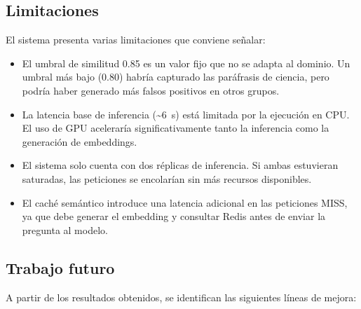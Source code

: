\subsection{Limitaciones}

El sistema presenta varias limitaciones que conviene señalar:

\begin{itemize}
    \item El umbral de similitud 0.85 es un valor fijo que no se adapta al dominio. Un umbral más bajo (0.80) habría capturado las paráfrasis de ciencia, pero podría haber generado más falsos positivos en otros grupos.
    
    \item La latencia base de inferencia (\textasciitilde6~s) está limitada por la ejecución en CPU. El uso de GPU aceleraría significativamente tanto la inferencia como la generación de embeddings.
    
    \item El sistema solo cuenta con dos réplicas de inferencia. Si ambas estuvieran saturadas, las peticiones se encolarían sin más recursos disponibles.
    
    \item El caché semántico introduce una latencia adicional en las peticiones MISS, ya que debe generar el embedding y consultar Redis antes de enviar la pregunta al modelo.
\end{itemize}

\subsection{Trabajo futuro}

A partir de los resultados obtenidos, se identifican las siguientes líneas de mejora:

